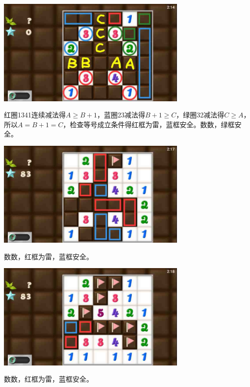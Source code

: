 \subsection{} %
\begin{center}
    \includegraphics[width=0.7\textwidth]{puzzlelow/230-1.jpg}
\end{center}
红圈1341连续减法得$A\ge B+1$，蓝圈23减法得$B+1\ge C$，绿圈32减法得$C\ge A$，所以$A=B+1=C$，检查等号成立条件得红框为雷，蓝框安全。数数，绿框安全。
\begin{center}
    \includegraphics[width=0.7\textwidth]{puzzlelow/230-2.jpg}
\end{center}
数数，红框为雷，蓝框安全。
\begin{center}
    \includegraphics[width=0.7\textwidth]{puzzlelow/230-3.jpg}
\end{center}
数数，红框为雷，蓝框安全。

